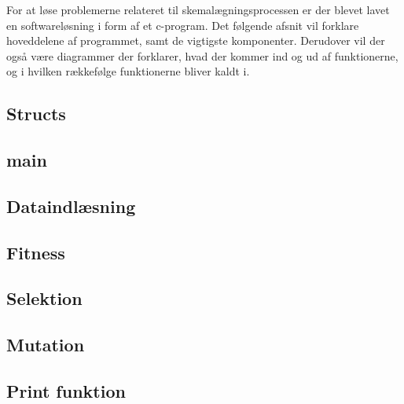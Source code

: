 
For at løse problemerne relateret til skemalægningsprocessen er der blevet lavet en softwareløsning i form af et c-program. Det følgende afsnit vil forklare hoveddelene af programmet, samt de vigtigste komponenter. Derudover vil der også være diagrammer der forklarer, hvad der kommer ind og ud af funktionerne, og i hvilken rækkefølge funktionerne bliver kaldt i.

\subsection{Structs}
  

\subsection{main}
  

\subsection{Dataindlæsning}
  

\subsection{Fitness}
  

\subsection{Selektion}
  

\subsection{Mutation}
  

\subsection{Print funktion}
  

